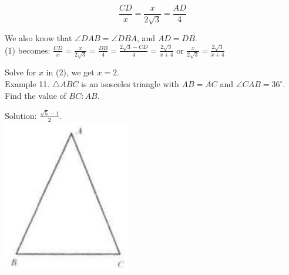 \documentclass[10pt]{article}
\begin{document}
\[
\frac{C D}{x}=\frac{x}{2 \sqrt{3}}=\frac{A D}{4}
\]

We also know that \(\angle D A B=\angle D B A\), and \(A D=D B\).\\
(1) becomes: \(\frac{C D}{x}=\frac{x}{2 \sqrt{3}}=\frac{D B}{4}=\frac{2 \sqrt{3}-C D}{4}=\frac{2 \sqrt{3}}{x+4}\) or \(\frac{x}{2 \sqrt{3}}=\frac{2 \sqrt{3}}{x+4}\)

Solve for \(x\) in (2), we get \(x=2\).\\
Example 11. \(\triangle A B C\) is an isosceles triangle with \(A B=A C\) and \(\angle C A B=36^{\circ}\). Find the value of \(B C: A B\).

Solution: \(\frac{\sqrt{5}-1}{2}\).\\
\includegraphics[max width=\textwidth, center]{2025_04_17_97bc1f7e44d93c271a88g-061}
\end{document}
